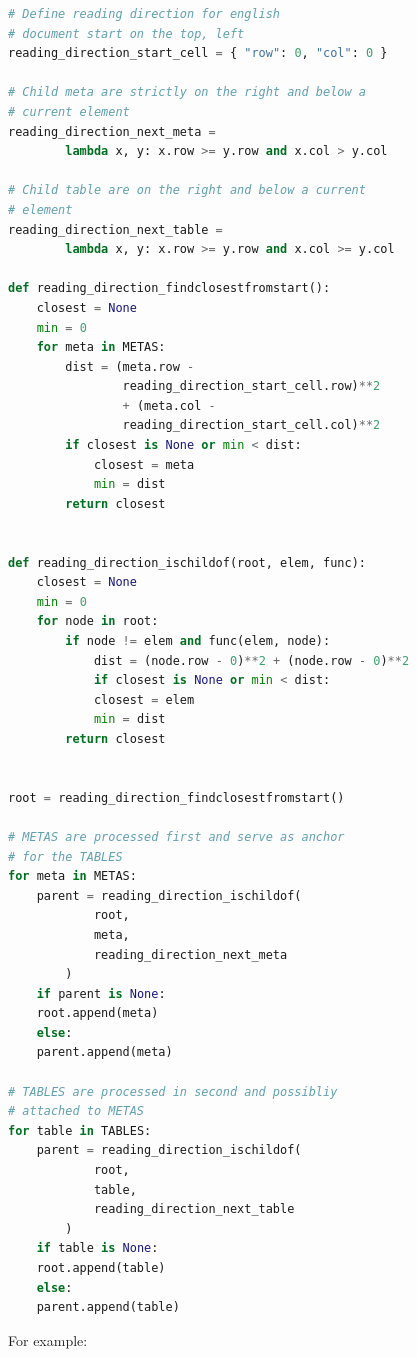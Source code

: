 \documentclass{article}
\begin{document}
\begin{lstlisting}[language=Python, caption=Tree Structure]
# Define reading direction for english
# document start on the top, left
reading_direction_start_cell = { "row": 0, "col": 0 }

# Child meta are strictly on the right and below a
# current element
reading_direction_next_meta =
        lambda x, y: x.row >= y.row and x.col > y.col

# Child table are on the right and below a current
# element
reading_direction_next_table =
        lambda x, y: x.row >= y.row and x.col >= y.col

def reading_direction_findclosestfromstart():
    closest = None
    min = 0
    for meta in METAS:
        dist = (meta.row - 
                reading_direction_start_cell.row)**2
                + (meta.col -
                reading_direction_start_cell.col)**2
        if closest is None or min < dist:
            closest = meta
            min = dist
        return closest


def reading_direction_ischildof(root, elem, func):
    closest = None
    min = 0
    for node in root:
        if node != elem and func(elem, node):
            dist = (node.row - 0)**2 + (node.row - 0)**2
            if closest is None or min < dist:
            closest = elem
            min = dist
        return closest


root = reading_direction_findclosestfromstart()

# METAS are processed first and serve as anchor
# for the TABLES
for meta in METAS:
    parent = reading_direction_ischildof(
            root,
            meta,
            reading_direction_next_meta
        )
    if parent is None:
    root.append(meta)
    else:
    parent.append(meta)
    
# TABLES are processed in second and possibliy
# attached to METAS
for table in TABLES:
    parent = reading_direction_ischildof(
            root,
            table,
            reading_direction_next_table
        )
    if table is None:
    root.append(table)
    else:
    parent.append(table)
\end{lstlisting}

For example:
\end{document}
